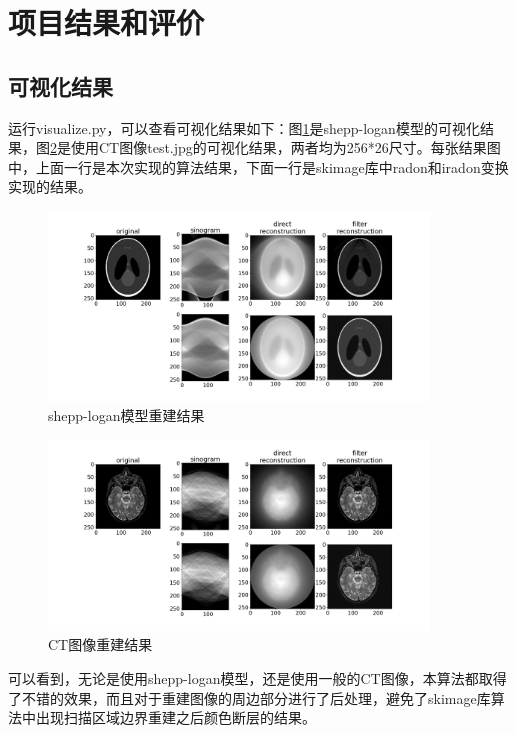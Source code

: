 \documentclass[UTF8]{ctexart}
\begin{document}
\section{项目结果和评价}
\subsection{可视化结果}
运行visualize.py，可以查看可视化结果如下：图\ref{fig result1}是shepp-logan模型的可视化结果，图\ref{fig result2}是使用CT图像test.jpg的可视化结果，两者均为256*26尺寸。每张结果图中，上面一行是本次实现的算法结果，下面一行是skimage库中radon和iradon变换实现的结果。
\begin{figure}[H]
    \centering
    \includegraphics[width=0.9\textwidth]{../image/sl_model.png}
    \caption{shepp-logan模型重建结果}
    \label{fig result1}
\end{figure}


\begin{figure}[H]
    \centering
    \includegraphics[width=0.9\textwidth]{../image/CT_result.png}
    \caption{CT图像重建结果}
    \label{fig result2}
\end{figure}
可以看到，无论是使用shepp-logan模型，还是使用一般的CT图像，本算法都取得了不错的效果，而且对于重建图像的周边部分进行了后处理，避免了skimage库算法中出现扫描区域边界重建之后颜色断层的结果。
\end{document}
